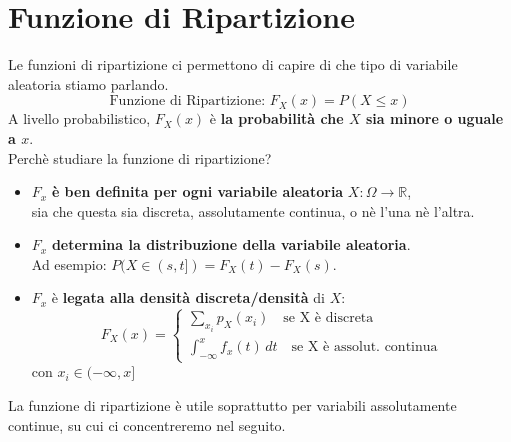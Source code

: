 \pagebreak

\section{Funzione di Ripartizione}
Le funzioni di ripartizione ci permettono di capire di che tipo di variabile aleatoria
stiamo parlando.
\[
	\text{Funzione di Ripartizione: } F_X (x) = P(X \leq x)
\]
A livello probabilistico, $F_X(x)$ è \textbf{la probabilità che $X$ sia minore o uguale a $x$}.
\\Perchè studiare la funzione di ripartizione?
\begin{itemize}
	\item $F_x$ \textbf{è ben definita per ogni variabile aleatoria} $X: \Omega \rightarrow \mathbb{R}$,
	      \\sia che questa sia discreta, assolutamente continua, o nè l'una nè l'altra.
	\item $F_x$\textbf{ determina la distribuzione della variabile aleatoria}.
	      \\Ad esempio: $P(X\in(s,t]) = F_X(t) - F_X(s)$.
	\item $F_x$ è \textbf{legata alla densità discreta/densità} di $X$:
	      \[
		      F_X(x) =
		      \begin{cases}
			      \sum_{x_i} p_X (x_i) \quad \text{se X è discreta} \\
			      \int_{-\infty}^{x} f_x(t)\,dt \quad \text{se X è assolut. continua}
		      \end{cases}
	      \]
	      con $x_i \in (- \infty, x]$
\end{itemize}
La funzione di ripartizione è utile soprattutto per variabili assolutamente continue, su cui
ci concentreremo nel seguito.

